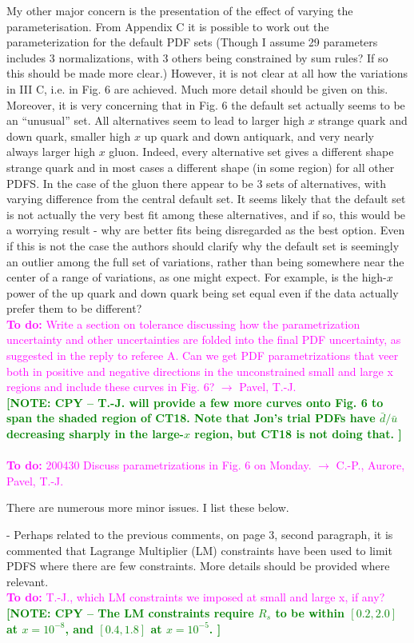 \documentclass[aps,prd,amsmath,nofootinbib,floatfix,fleqn]{revtex4}
\newcommand{\TODO}[1]{\textcolor{magenta}{
\quad\vspace{3pt} \\ {\bf To do:} #1 \\
}}
\newcommand{\NOTECPY}[1]{\textcolor{green}{ \bf[NOTE: CPY -- #1 ]}}
\begin{document}
My other major concern is the presentation of the effect of varying the
parameterisation. From Appendix C it is possible to work out the
parameterization for the default PDF sets (Though I assume 29 parameters
includes 3 normalizations, with 3 others being constrained by sum rules? If so
this should be made more clear.) However, it is not clear at all how the
variations in III C, i.e. in Fig. 6 are achieved. Much more detail should be
given on this. Moreover, it is very concerning that in Fig. 6 the default set
actually seems to be an ``unusual'' set. All alternatives seem to lead to larger
high $x$ strange quark and down quark, smaller high $x$ up quark and down
antiquark, and very nearly always larger high $x$ gluon. Indeed, every
alternative set gives a different shape strange quark and in most cases a
different shape (in some region) for all other PDFS. In the case of the gluon
there appear to be 3 sets of alternatives, with varying difference from the
central default set. It seems likely that the default set is not actually the
very best fit among these alternatives, and if so, this would be a worrying
result - why are better fits being disregarded as the best option. Even if this
is not the case  the authors should clarify why the default set is seemingly an
outlier among the full set of variations, rather than being somewhere near the
center of a range of variations, as one might expect. For example, is the
high-$x$ power of the up quark and down
quark being set equal even if the data actually prefer them to be different?
\TODO{Write a section on tolerance discussing how the parametrization uncertainty and other uncertainties are folded into the final PDF uncertainty, as suggested in the reply to referee A. Can we get PDF parametrizations that veer both in positive and negative directions in the unconstrained small and large x regions and include these curves in Fig. 6? $\to$ Pavel, T.-J.}
\NOTECPY{T.-J. will provide a few more curves onto Fig. 6 to span the shaded region of CT18. Note that Jon's trial PDFs have ${\bar d}/{\bar u}$ decreasing sharply in the large-$x$ region, but CT18 is not doing that. } \\
\TODO{200430 Discuss parametrizations in Fig. 6 on Monday. $\to$ C.-P., Aurore, Pavel, T.-J.}

There are numerous more minor issues. I list these below.

- Perhaps related to the previous comments, on page 3, second paragraph, it is
commented that Lagrange Multiplier (LM) constraints have been used to limit PDFS
where there are few constraints. More details should be provided where relevant.
\TODO{T.-J., which LM constraints we imposed at small and large x, if any?}
\NOTECPY{The LM constraints require $R_s$ to be within $[0.2, 2.0]$ at $x=10^{-8}$, and $[0.4, 1.8]$ at $x=10^{-5}$.}
\end{document}
